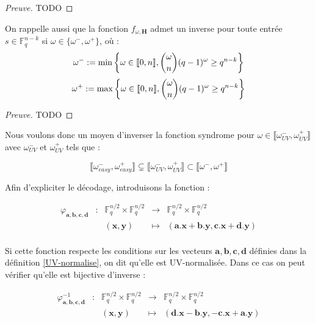 \documentclass[12pt]{article}
\theoremstyle{plain}
\newcommand{\F}{\mathbb{F}}
\begin{document}
\begin{proof}[Preuve] TODO
\end{proof}


\noindent On rappelle aussi que la fonction $f_{\omega,\mathbf{H}}$ admet un inverse pour toute entrée $s \in \F_q^{n-k}$ si $\omega \in \{\omega^-,\omega^+\}$, où :
$$\omega^- := \min\left\{\omega\in \llbracket0,n\rrbracket , \dbinom{\omega}{n}(q-1)^{\omega} \geq q^{n-k}\right\} $$
$$\omega^+ := \max\left\{\omega\in \llbracket0,n\rrbracket , \dbinom{\omega}{n}(q-1)^{\omega} \geq q^{n-k}\right\}$$

\begin{proof}[Preuve] TODO
\end{proof}


\noindent Nous voulons donc un moyen d'inverser la fonction syndrome pour $\omega \in \llbracket\omega_{UV}^-,\omega_{UV}^+\rrbracket$ avec $\omega_{UV}^-$ et $\omega_{UV}^+$ tels que :

$$\llbracket\omega_{easy}^-,\omega_{easy}^+\rrbracket \subsetneq \llbracket\omega_{UV}^-,\omega_{UV}^+\rrbracket \subset  \llbracket\omega^-,\omega^+\rrbracket$$


\noindent Afin d'expliciter le décodage, introduisons la fonction :

$$\begin{array}{ccccc}
\varphi_{\mathbf{a},\mathbf{b},\mathbf{c},\mathbf{d}} & : & \F_q^{n/2} \times  \F_q^{n/2} & \to & \F_q^{n/2} \times  \F_q^{n/2} \\
 & & (\mathbf{x} , \mathbf{y}) & \mapsto &  (\mathbf{a}.\mathbf{x} + \mathbf{b}.\mathbf{y}, \mathbf{c}.\mathbf{x} + \mathbf{d}.\mathbf{y}) \\
\end{array}$$

\noindent Si cette fonction respecte les conditions sur les vecteurs $\mathbf{a},\mathbf{b},\mathbf{c},\mathbf{d}$ définies dans la définition \ref{UV-normalise}, on dit qu'elle est UV-normalisée. Dans ce cas on peut vérifier qu'elle est bijective d'inverse :

$$\begin{array}{ccccc}
\varphi^{-1}_{\mathbf{a},\mathbf{b},\mathbf{c},\mathbf{d}} & : & \F_q^{n/2} \times  \F_q^{n/2} & \to & \F_q^{n/2} \times  \F_q^{n/2} \\
 & & (\mathbf{x} , \mathbf{y}) & \mapsto &  (\mathbf{d}.\mathbf{x} - \mathbf{b}.\mathbf{y}, -\mathbf{c}.\mathbf{x} + \mathbf{a}.\mathbf{y}) \\
\end{array}$$
\end{document}
